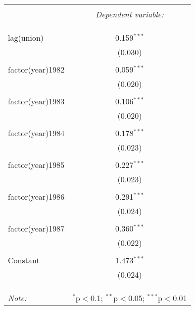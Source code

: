 
\begin{table}[!htbp] \centering 
  \caption{} 
  \label{} 
\begin{tabular}{@{\extracolsep{5pt}}lc} 
\\[-1.8ex]\hline 
\hline \\[-1.8ex] 
 & \multicolumn{1}{c}{\textit{Dependent variable:}} \\ 
\cline{2-2} 
\\[-1.8ex] &   \\ 
\hline \\[-1.8ex] 
 lag(union) & 0.159$^{***}$ \\ 
  & (0.030) \\ 
  & \\ 
 factor(year)1982 & 0.059$^{***}$ \\ 
  & (0.020) \\ 
  & \\ 
 factor(year)1983 & 0.106$^{***}$ \\ 
  & (0.020) \\ 
  & \\ 
 factor(year)1984 & 0.178$^{***}$ \\ 
  & (0.023) \\ 
  & \\ 
 factor(year)1985 & 0.227$^{***}$ \\ 
  & (0.023) \\ 
  & \\ 
 factor(year)1986 & 0.291$^{***}$ \\ 
  & (0.024) \\ 
  & \\ 
 factor(year)1987 & 0.360$^{***}$ \\ 
  & (0.022) \\ 
  & \\ 
 Constant & 1.473$^{***}$ \\ 
  & (0.024) \\ 
  & \\ 
\hline \\[-1.8ex] 
\hline 
\hline \\[-1.8ex] 
\textit{Note:}  & \multicolumn{1}{r}{$^{*}$p$<$0.1; $^{**}$p$<$0.05; $^{***}$p$<$0.01} \\ 
\end{tabular} 
\end{table} 
